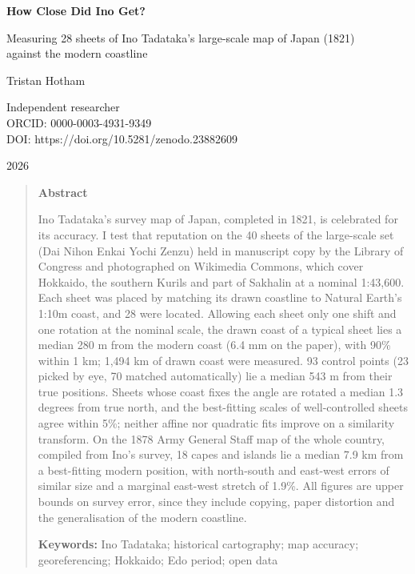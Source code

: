 \documentclass[11pt,a4paper]{article}
\begin{document}
\begin{center}
{\Large\bfseries How Close Did Ino Get?\par}
\vspace{0.4em}
{\large Measuring 28 sheets of Ino Tadataka's large-scale map of Japan (1821)\\against the modern coastline\par}
\vspace{1.2em}
{\large Tristan Hotham\par}
\vspace{0.3em}
{\small Independent researcher\\
ORCID: 0000-0003-4931-9349\\
DOI: https://doi.org/10.5281/zenodo.23882609\par}
\vspace{0.8em}
2026
\end{center}

\begin{quote}
\small
\begin{center}\textbf{Abstract}\end{center}
Ino Tadataka's survey map of Japan, completed in 1821, is celebrated for its accuracy. I test that reputation on the 40 sheets of the large-scale set (Dai Nihon Enkai Yochi Zenzu) held in manuscript copy by the Library of Congress and photographed on Wikimedia Commons, which cover Hokkaido, the southern Kurils and part of Sakhalin at a nominal 1:43,600. Each sheet was placed by matching its drawn coastline to Natural Earth's 1:10m coast, and 28 were located. Allowing each sheet only one shift and one rotation at the nominal scale, the drawn coast of a typical sheet lies a median 280 m from the modern coast (6.4 mm on the paper), with 90\% within 1 km; 1,494 km of drawn coast were measured. 93 control points (23 picked by eye, 70 matched automatically) lie a median 543 m from their true positions. Sheets whose coast fixes the angle are rotated a median 1.3 degrees from true north, and the best-fitting scales of well-controlled sheets agree within 5\%; neither affine nor quadratic fits improve on a similarity transform. On the 1878 Army General Staff map of the whole country, compiled from Ino's survey, 18 capes and islands lie a median 7.9 km from a best-fitting modern position, with north-south and east-west errors of similar size and a marginal east-west stretch of 1.9\%. All figures are upper bounds on survey error, since they include copying, paper distortion and the generalisation of the modern coastline.

\textbf{Keywords:} Ino Tadataka; historical cartography; map accuracy; georeferencing; Hokkaido; Edo period; open data
\end{quote}
\end{document}

